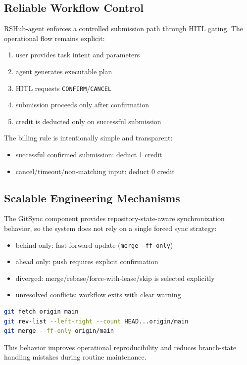 \subsection{Reliable Workflow Control}
RSHub-agent enforces a controlled submission path through HITL gating. The operational flow remains explicit:
\begin{enumerate}
	\item user provides task intent and parameters
	\item agent generates executable plan
	\item HITL requests \texttt{CONFIRM}/\texttt{CANCEL}
	\item submission proceeds only after confirmation
	\item credit is deducted only on successful submission
\end{enumerate}

The billing rule is intentionally simple and transparent:
\begin{itemize}
	\item successful confirmed submission: deduct 1 credit
	\item cancel/timeout/non-matching input: deduct 0 credit
\end{itemize}

\subsection{Scalable Engineering Mechanisms}
The GitSync component provides repository-state-aware synchronization behavior, so the system does not rely on a single forced sync strategy:
\begin{itemize}
    \item behind only: fast-forward update (\texttt{merge --ff-only})
    \item ahead only: push requires explicit confirmation
    \item diverged: merge/rebase/force-with-lease/skip is selected explicitly
    \item unresolved conflicts: workflow exits with clear warning
\end{itemize}

\begin{lstlisting}[language=bash, basicstyle=\ttfamily\footnotesize]
git fetch origin main
git rev-list --left-right --count HEAD...origin/main
git merge --ff-only origin/main
\end{lstlisting}

This behavior improves operational reproducibility and reduces branch-state handling mistakes during routine maintenance.

